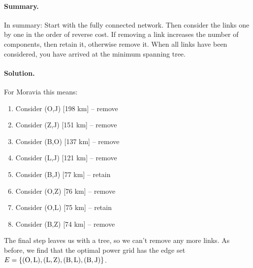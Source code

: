 \paragraph{Summary.}In summary: Start with the fully connected network. Then consider the links one by one in the order of reverse cost. If removing a link increases the number of components, then retain it, otherwise remove it. When all links have been considered, you have arrived at the minimum spanning tree.    

\pagebreak\noindent
\paragraph{Solution.}For Moravia this means:
\begin{enumerate}[label=\arabic*.]
\item Consider (O,J) [198 km] -- remove 
\item Consider (Z,J) [151 km] -- remove
\item Consider (B,O) [137 km] -- remove
\item Consider (L,J) [121 km] -- remove
\item Consider (B,J) [77 km] -- retain
\item Consider (O,Z) [76 km] -- remove
\item Consider (O,L) [75 km] -- retain
\item Consider (B,Z) [74 km] -- remove
 \end{enumerate}
The final step leaves us with a tree, so we can't remove any more links. As before, we find that the optimal power grid has the edge set $E=\{{\rm(O,L),(L,Z),(B,L),(B,J) }\}$.
